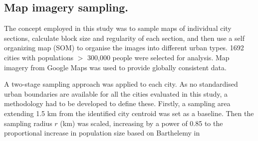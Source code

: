 \documentclass{nature}
\begin{document}
\begin{methods}
%
%





\subsection{Map imagery sampling.}\label{sec:methods2}
The concept employed in this study was to sample maps of individual city sections, calculate block size and regularity of each section, and then use a self organizing map (SOM) to organise the images into different urban types. 1692 cities with populations $>$ 300,000 people\cite{UN2014} were selected for analysis. Map imagery from Google Maps\cite{GoogleStatic2017} was used to provide globally consistent data. 

A two-stage sampling approach was applied to each city. As no standardised urban boundaries are available for all the cities evaluated in this study, a methodology had to be developed to define these. Firstly, a sampling area extending 1.5 km from the identified city centroid\cite{UN2014} was set as a baseline. Then the sampling radius $r$ (km) was scaled, increasing by a power of 0.85 to the proportional increase in population size based on Barthelemy\cite{Barthelemy2016} in 


\end{methods}
\end{document}
